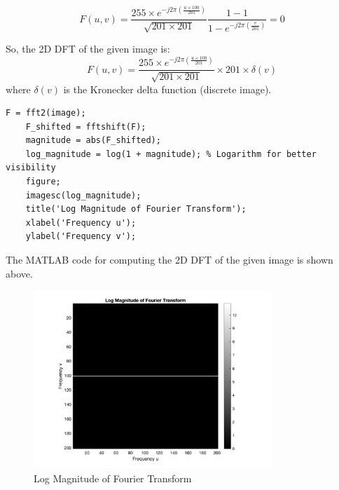 \documentclass[12pt]{article}
\begin{document}
\begin{equation}
    F(u, v) = \frac{255\times e^{-j2\pi\left(\frac{u\times 100}{201}\right)}}{\sqrt{201\times 201}} \frac{1-1}{1-e^{-j2\pi\left(\frac{v}{201}\right)}} = 0
\end{equation}

So, the 2D DFT of the given image is:
\begin{equation}
    F(u, v) = \frac{255\times e^{-j2\pi\left(\frac{u\times 100}{201}\right)}}{\sqrt{201\times 201}} \times 201 \times \delta(v)
\end{equation}
where $\delta(v)$ is the Kronecker delta function (discrete image).
\begin{lstlisting}[style=Matlab,caption={MATLAB code for Fourier Transform}]    
    F = fft2(image);
    F_shifted = fftshift(F);
    magnitude = abs(F_shifted);
    log_magnitude = log(1 + magnitude); % Logarithm for better visibility
    figure;
    imagesc(log_magnitude);
    title('Log Magnitude of Fourier Transform');
    xlabel('Frequency u');
    ylabel('Frequency v');
\end{lstlisting}

\clearpage
The MATLAB code for computing the 2D DFT of the given image is shown above.


\begin{figure}
    \centering
    \includegraphics[width=0.8\textwidth]{../images/fourier_log_magnitude_image.png}
    \caption{Log Magnitude of Fourier Transform}
    \label{fig:fft}
\end{figure}
\end{document}
